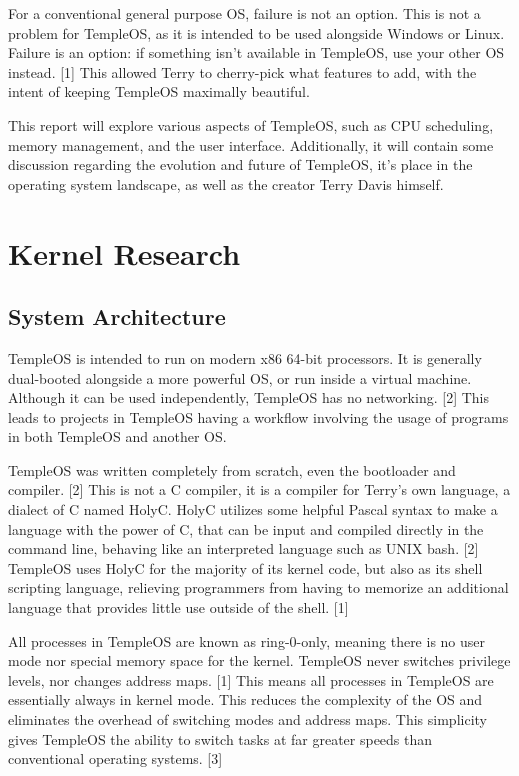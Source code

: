 \documentclass[11pt]{article}
\begin{document}
For a conventional general purpose OS, failure is not an option. This is not a
problem for TempleOS, as it is intended to be used alongside Windows or Linux.
Failure is an option: if something isn't available in TempleOS, use your other
OS instead. [1] This allowed Terry to cherry-pick what features to add, with the
intent of keeping TempleOS maximally beautiful.

This report will explore various aspects of TempleOS, such as CPU scheduling,
memory management, and the user interface. Additionally, it will contain some
discussion regarding the evolution and future of TempleOS, it's place in the
operating system landscape, as well as the creator Terry Davis himself.

 \newpage

\section{Kernel Research}
\label{sec:org68ccf65}

\subsection{System Architecture}
\label{sec:org7bd08fd}

TempleOS is intended to run on modern x86 64-bit processors. It is generally
dual-booted alongside a more powerful OS, or run inside a virtual machine.
Although it can be used independently, TempleOS has no networking. [2] This
leads to projects in TempleOS having a workflow involving the usage of programs
in both TempleOS and another OS.

TempleOS was written completely from scratch, even the bootloader and
compiler. [2] This is not a C compiler, it is a compiler for Terry's own
language, a dialect of C named HolyC. HolyC utilizes some helpful Pascal syntax
to make a language with the power of C, that can be input and compiled directly
in the command line, behaving like an interpreted language such as UNIX
bash. [2] TempleOS uses HolyC for the majority of its kernel code, but also as
its shell scripting language, relieving programmers from having to memorize an
additional language that provides little use outside of the shell. [1]

All processes in TempleOS are known as ring-0-only, meaning there is no user
mode nor special memory space for the kernel. TempleOS never switches privilege
levels, nor changes address maps. [1] This means all processes in TempleOS are
essentially always in kernel mode. This reduces the complexity of the OS and
eliminates the overhead of switching modes and address maps. This simplicity
gives TempleOS the ability to switch tasks at far greater speeds than
conventional operating systems. [3]
\end{document}
